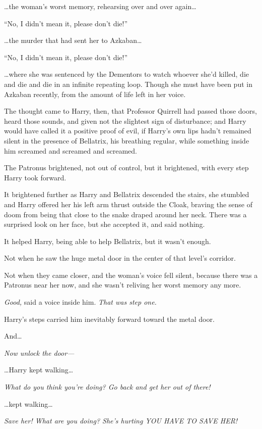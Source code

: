 \ldots{}the woman's worst memory, rehearsing over and over again\ldots{}

``No, I didn't mean it, please don't die!''

\ldots{}the murder that had sent her to Azkaban\ldots{}

``No, I didn't mean it, please don't die!''

\ldots{}where she was sentenced by the Dementors to watch whoever she'd
killed, die and die and die in an infinite repeating loop. Though she
must have been put in Azkaban recently, from the amount of life left in
her voice.

The thought came to Harry, then, that Professor Quirrell had passed
those doors, heard those sounds, and given not the slightest sign of
disturbance; and Harry would have called it a positive proof of evil, if
Harry's own lips hadn't remained silent in the presence of Bellatrix,
his breathing regular, while something inside him screamed and screamed
and screamed.

The Patronus brightened, not out of control, but it brightened, with
every step Harry took forward.

It brightened further as Harry and Bellatrix descended the stairs, she
stumbled and Harry offered her his left arm thrust outside the Cloak,
braving the sense of doom from being that close to the snake draped
around her neck. There was a surprised look on her face, but she
accepted it, and said nothing.

It helped Harry, being able to help Bellatrix, but it wasn't enough.

Not when he saw the huge metal door in the center of that level's
corridor.

Not when they came closer, and the woman's voice fell silent, because
there was a Patronus near her now, and she wasn't reliving her worst
memory any more.

\emph{Good,} said a voice inside him. \emph{That was step one.}

Harry's steps carried him inevitably forward toward the metal door.

And\ldots{}

\emph{Now unlock the door---}

\ldots{}Harry kept walking\ldots{}

\emph{What do you think you're doing? Go back and get her out of there!}

\ldots{}kept walking\ldots{}

\emph{Save her! What are you doing? She's hurting YOU HAVE TO SAVE HER!}

